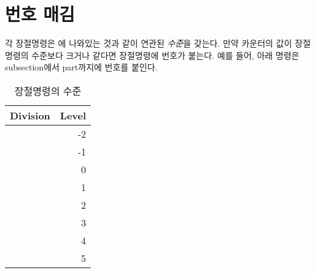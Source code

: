 \section{번호 매김} \label{sec:secnumbers}

각 장절명령은 에 나와있는 것과 같이
연관된 \emph{수준}을 갖는다.
만약  카운터의 값이 장절명령의 수준보다 크거나 같다면 장절명령에
번호가 붙는다. 예를 들어, 아래 명령은 subsection에서 part까지에 번호를 붙인다.
\begin{lcode}
\setcounter{secnumdepth}{2}
\end{lcode}

\begin{table}
\centering
\caption{장절명령의 수준} \label{tab:seclevels}
\begin{tabular}{lr} \toprule
Division       & Level \\ \midrule
\cmd{\book}           & -2 \\
\cmd{\part}           & -1 \\
\cmd{\chapter}        & 0 \\
\cmd{\section}        & 1 \\
\cmd{\subsection}     & 2 \\
\cmd{\subsubsection}  & 3 \\
\cmd{\paragraph}      & 4 \\
\cmd{\subparagraph}   & 5 \\ \bottomrule
\end{tabular}
\end{table}

